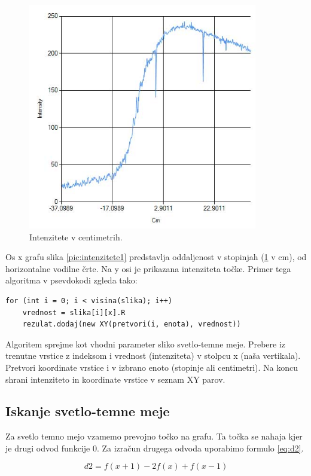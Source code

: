 \documentclass[oneside, a4paper, 12pt]{book}
\begin{document}
\begin{figure}
\begin{center}
\includegraphics[width=10cm]{slike/intenzitete-v-cm.jpg}
\end{center}
\caption{Intenzitete v centimetrih.}
\label{pic:intenzitete2}
\end{figure}

Os x grafu slika \ref{pic:intenzitete1} predstavlja oddaljenost v stopinjah (\ref{pic:intenzitete2} v cm), od horizontalne vodilne črte. Na y osi je prikazana intenziteta točke. Primer tega algoritma v psevdokodi zgleda tako:


\begin{verbatim}
for (int i = 0; i < visina(slika); i++)
    vrednost = slika[i][x].R
    rezulat.dodaj(new XY(pretvori(i, enota), vrednost))
\end{verbatim}

Algoritem sprejme kot vhodni parameter sliko svetlo-temne meje. Prebere iz trenutne vrstice z indeksom i vrednost (intenziteta) v stolpcu x (naša vertikala). Pretvori koordinate vrstice i v izbrano enoto (stopinje ali centimetri). Na koncu shrani intenziteto in koordinate vrstice v seznam XY parov.

\subsection{Iskanje svetlo-temne meje}
Za svetlo temno mejo vzamemo prevojno točko na grafu. Ta točka se nahaja kjer je drugi odvod funkcije 0. Za izračun drugega odvoda uporabimo formulo \ref{eq:d2}.

\begin{equation}
d2=f(x+1) - 2f(x) + f(x-1)
\label{eq:d2}
\end{equation}
\end{document}
